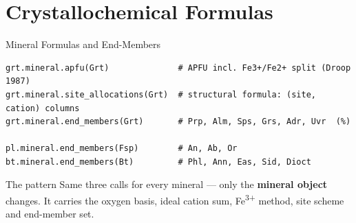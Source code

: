 \documentclass[aspectratio=169,11pt]{beamer}
\begin{document}
\section{Crystallochemical Formulas}

\begin{frame}[fragile]{Mineral Formulas and End-Members}
  \begin{lstlisting}[style=python]
grt.mineral.apfu(Grt)              # APFU incl. Fe3+/Fe2+ split (Droop 1987)
grt.mineral.site_allocations(Grt)  # structural formula: (site, cation) columns
grt.mineral.end_members(Grt)       # Prp, Alm, Sps, Grs, Adr, Uvr  (%)

pl.mineral.end_members(Fsp)        # An, Ab, Or
bt.mineral.end_members(Bt)         # Phl, Ann, Eas, Sid, Dioct
  \end{lstlisting}
  \vspace{0.2cm}
  \begin{block}{The pattern}
    Same three calls for every mineral --- only the \textbf{mineral object}
    changes. It carries the oxygen basis, ideal cation sum, Fe\textsuperscript{3+}
    method, site scheme and end-member set.
  \end{block}
\end{frame}
\end{document}
